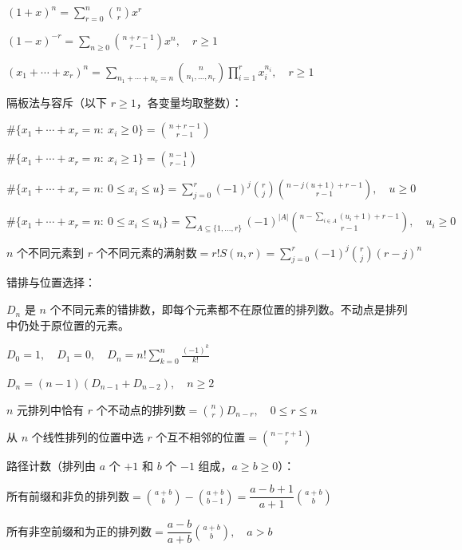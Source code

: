 $(1+x)^n=\displaystyle\sum_{r=0}^{n}\binom nr x^r$

$(1-x)^{-r}=\displaystyle\sum_{n\ge0}\binom{n+r-1}{r-1}x^n,\quad r\ge1$

$(x_1+\cdots+x_r)^n=\displaystyle\sum_{n_1+\cdots+n_r=n}\binom{n}{n_1,\dots,n_r}\prod_{i=1}^{r}x_i^{n_i},\quad r\ge1$

隔板法与容斥（以下 $r\ge1$，各变量均取整数）：\nopagebreak[4]

$\#\{x_1+\cdots+x_r=n:\ x_i\ge0\}=\binom{n+r-1}{r-1}$

$\#\{x_1+\cdots+x_r=n:\ x_i\ge1\}=\binom{n-1}{r-1}$

$\#\{x_1+\cdots+x_r=n:\ 0\le x_i\le u\}=\displaystyle\sum_{j=0}^{r}(-1)^j\binom rj\binom{n-j(u+1)+r-1}{r-1},\quad u\ge0$

$\#\{x_1+\cdots+x_r=n:\ 0\le x_i\le u_i\}=\displaystyle\sum_{A\subseteq\{1,\dots,r\}}(-1)^{|A|}\binom{n-\sum_{i\in A}(u_i+1)+r-1}{r-1},\quad u_i\ge0$

$\text{$n$ 个不同元素到 $r$ 个不同元素的满射数}=r!S(n,r)=\displaystyle\sum_{j=0}^{r}(-1)^j\binom rj(r-j)^n$

错排与位置选择：\nopagebreak[4]

$D_n$ 是 $n$ 个不同元素的错排数，即每个元素都不在原位置的排列数。不动点是排列中仍处于原位置的元素。

$D_0=1,\quad D_1=0,\quad D_n=n!\displaystyle\sum_{k=0}^{n}\frac{(-1)^k}{k!}$

$D_n=(n-1)(D_{n-1}+D_{n-2}),\quad n\ge2$

$\text{$n$ 元排列中恰有 $r$ 个不动点的排列数}=\binom nr D_{n-r},\quad0\le r\le n$

$\text{从 $n$ 个线性排列的位置中选 $r$ 个互不相邻的位置}=\binom{n-r+1}r$

路径计数（排列由 $a$ 个 $+1$ 和 $b$ 个 $-1$ 组成，$a\ge b\ge0$）：\nopagebreak[4]

$\text{所有前缀和非负的排列数}=\binom{a+b}b-\binom{a+b}{b-1}=\dfrac{a-b+1}{a+1}\binom{a+b}b$

$\text{所有非空前缀和为正的排列数}=\dfrac{a-b}{a+b}\binom{a+b}b,\quad a>b$

